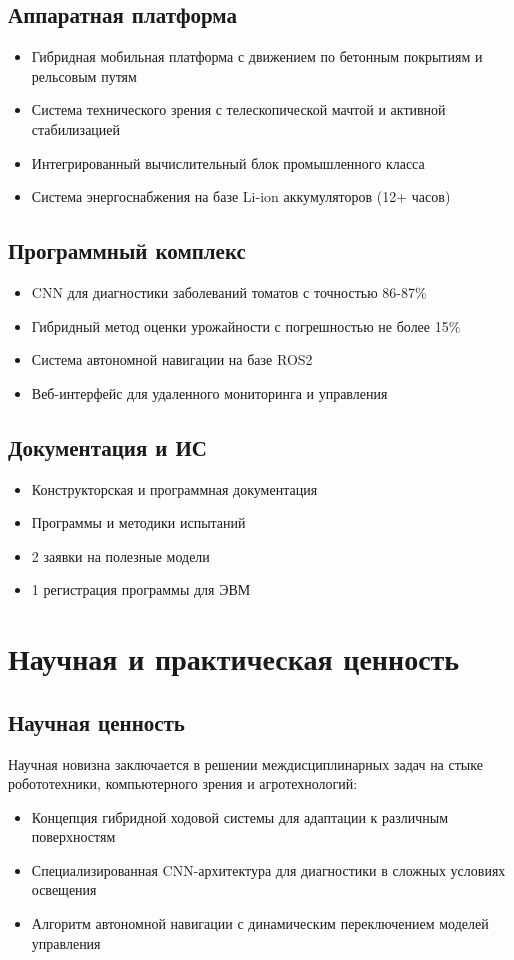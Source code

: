 \documentclass[12pt,a4paper]{article}
\begin{document}
\subsection{Аппаратная платформа}
\begin{itemize}
    \item Гибридная мобильная платформа с движением по бетонным покрытиям и рельсовым путям
    \item Система технического зрения с телескопической мачтой и активной стабилизацией
    \item Интегрированный вычислительный блок промышленного класса
    \item Система энергоснабжения на базе Li-ion аккумуляторов (12+ часов)
\end{itemize}

\subsection{Программный комплекс}
\begin{itemize}
    \item CNN для диагностики заболеваний томатов с точностью 86-87\%
    \item Гибридный метод оценки урожайности с погрешностью не более 15\%
    \item Система автономной навигации на базе ROS2
    \item Веб-интерфейс для удаленного мониторинга и управления
\end{itemize}

\subsection{Документация и ИС}
\begin{itemize}
    \item Конструкторская и программная документация
    \item Программы и методики испытаний
    \item 2 заявки на полезные модели
    \item 1 регистрация программы для ЭВМ
\end{itemize}

\section{Научная и практическая ценность}

\subsection{Научная ценность}
Научная новизна заключается в решении междисциплинарных задач на стыке робототехники, компьютерного зрения и агротехнологий:
\begin{itemize}
    \item Концепция гибридной ходовой системы для адаптации к различным поверхностям
    \item Специализированная CNN-архитектура для диагностики в сложных условиях освещения
    \item Алгоритм автономной навигации с динамическим переключением моделей управления
\end{itemize}
\end{document}
